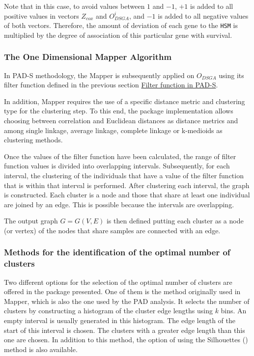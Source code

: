 Note that in this case, to avoid values between \(1\) and \(-1\), \(+1\) is added to all positive values in vectors \(Z_{cox}\) and \(O_{DSGA}^{i}\), and \(-1\) is added to all negative values of both vectors. Therefore, the amount of deviation of each gene to the \texttt{HSM} is multiplied by the degree of association of this particular gene with survival.

\hypertarget{section2.3.2}{%
\subsubsection{The One Dimensional Mapper Algorithm}\label{section2.3.2}}

In PAD-S methodology, the Mapper is subsequently applied on \(O_{DSGA}\) using its filter function defined in the previous section \protect\hyperlink{section2.3.1}{Filter function in PAD-S}.

In addition, Mapper requires the use of a specific distance metric and clustering type for the clustering step.
To this end, the  package implementation allows choosing between correlation and Euclidean distances as distance metrics and among single linkage, average linkage, complete linkage or k-medioids as clustering methods.

Once the values of the filter function have been calculated, the range of filter function values is divided into overlapping intervals. Subsequently, for each interval, the clustering of the individuals that have a value of the filter function that is within that interval is performed. After clustering each interval, the graph is constructed. Each cluster is a node and those that share at least one individual are joined by an edge. This is possible because the intervals are overlapping.

The output graph \(G=G(V,E)\) is then defined putting each cluster as a node (or vertex) of the nodes that share samples are connected with an edge.

\hypertarget{section2.3.3}{%
\subsubsection{Methods for the identification of the optimal number of clusters}\label{section2.3.3}}

Two different options for the selection of the optimal number of clusters are offered in the package presented. One of them is the method originally used in Mapper, which is also the one used by the PAD analysis. It selects the number of clusters by constructing a histogram of the cluster edge lengths using \(k\) bins. An empty interval is usually generated in this histogram. The edge length of the start of this interval is chosen. The clusters with a greater edge length than this one are chosen. In addition to this method, the option of using the Silhouettes (\citet{rousseeuw1987silhouettes}) method is also available.

